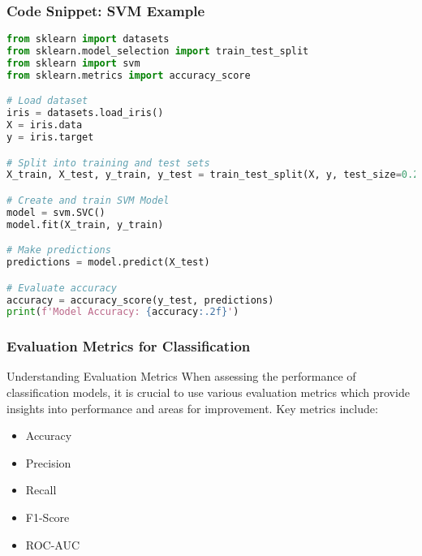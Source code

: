 \documentclass[aspectratio=169]{beamer}
\begin{document}
\begin{frame}[fragile]
    \frametitle{Code Snippet: SVM Example}
    \begin{lstlisting}[language=Python]
from sklearn import datasets
from sklearn.model_selection import train_test_split
from sklearn import svm
from sklearn.metrics import accuracy_score

# Load dataset
iris = datasets.load_iris()
X = iris.data
y = iris.target

# Split into training and test sets
X_train, X_test, y_train, y_test = train_test_split(X, y, test_size=0.2)

# Create and train SVM Model
model = svm.SVC()
model.fit(X_train, y_train)

# Make predictions
predictions = model.predict(X_test)

# Evaluate accuracy
accuracy = accuracy_score(y_test, predictions)
print(f'Model Accuracy: {accuracy:.2f}')
    \end{lstlisting}
\end{frame}

\begin{frame}[fragile]
    \frametitle{Evaluation Metrics for Classification}
    
    \begin{block}{Understanding Evaluation Metrics}
        When assessing the performance of classification models, it is crucial to use various evaluation metrics which provide insights into performance and areas for improvement. Key metrics include:
        \begin{itemize}
            \item Accuracy
            \item Precision
            \item Recall
            \item F1-Score
            \item ROC-AUC
        \end{itemize}
    \end{block}
\end{frame}
\end{document}
